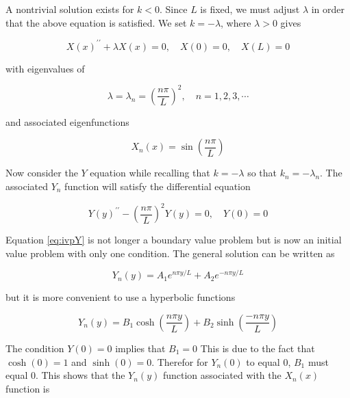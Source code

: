 A nontrivial solution exists for $k<0$. Since $L$ is fixed, we must adjust $\lambda$ in order that the above equation is satisfied. We set $k=-\lambda$, where $\lambda > 0$ gives

\begin{equation}\label{sovXLambda}
X\left(x\right) ^ { \prime \prime } + \lambda X\left(x\right) = 0 , \quad X \left( 0 \right) = 0 , \quad X \left( L \right) = 0
\end{equation}

with eigenvalues of 

\begin{equation}\label{eigen}
\lambda = \lambda _ { n } = \left( \frac { n \pi } { L } \right) ^ { 2 } , \quad n = 1,2,3 , \cdots
\end{equation}

and associated eigenfunctions

\begin{equation}\label{eigenfunction}
X _ { n } \left( x \right) = \sin \left( \frac { n \pi } { L } \right)
\end{equation}

Now consider the $Y$ equation while recalling that $k=-\lambda$ so that $k_n = -\lambda_n$. The associated $Y_n$ function will satisfy the differential equation

\begin{equation}\label{eq:ivpY}
Y\left(y\right) ^ { \prime \prime } - \left( \frac{n\pi}{L} \right)^2 Y\left(y\right) = 0 , \quad Y \left( 0 \right) = 0
\end{equation}

Equation \ref{eq:ivpY} is not longer a boundary value problem but is now an initial value problem with only one condition. The general solution can be written as

\begin{equation}\label{eq:ivpYGS}
Y_{ n } \left( y \right) = A _ { 1 } e ^ { n \pi y / L } + A _ { 2 } e ^ { - n \pi y / L }
\end{equation}

but it is more convenient to use a hyperbolic functions

\begin{equation}\label{eq:ivpYGSHyper}
Y _ { n } \left( y \right) = B _ { 1 } \cosh \left( \frac{n \pi y} { L } \right) + B _ { 2 } \sinh \left(\frac{ - n \pi y }{ L }\right)
\end{equation}

The condition $Y \left( 0 \right) = 0$ implies that $B_1 = 0$ This is due to the fact that $\cosh \left(0\right) = 1$ and $\sinh \left(0\right) = 0$. Therefor for $Y_n(0)$ to equal $0$, $B_1$ must equal $0$. This shows that the $Y_n \left(y\right)$ function associated with the $X_n \left(x\right)$ function is

